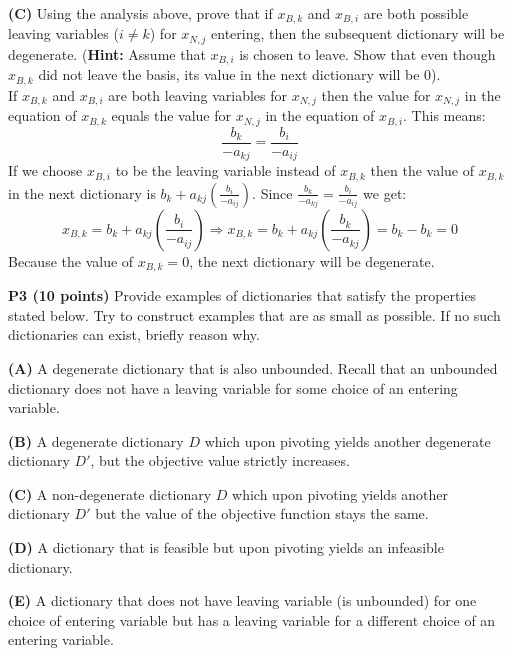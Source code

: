 \documentclass[11pt]{article}
\begin{document}
\medskip


\noindent\textbf{(C)} Using the analysis above, prove that if $x_{B,k}$
and $x_{B,i}$ are both possible leaving variables ($i \not= k$) for $x_{N,j}$ entering,
then  the subsequent dictionary will be degenerate.  (\textbf{Hint:}
Assume that $x_{B,i}$ is chosen to leave. Show that even though $x_{B,k}$ did not leave the basis, its value in
the  next dictionary will be $0$).
\\
If $x_{B,k}$ and $x_{B,i}$ are both leaving variables for $x_{N,j}$ then the value for $x_{N,j}$ in the equation of $x_{B,k}$ equals the value for $x_{N,j}$ in the equation of $x_{B,i}$.  This means:
$$
\frac{b_k}{-a_{kj}} = \frac{b_i}{-a_{ij}}
$$
If we choose $x_{B,i}$ to be the leaving variable instead of $x_{B,k}$ then the value of $x_{B,k}$ in the next dictionary is $b_k + a_{kj}(\frac{b_i}{ - a_{ij}})$.  Since $\frac{b_k}{-a_{kj}} = \frac{b_i}{-a_{ij}}$ we get:
$$
x_{B,k} = b_k + a_{kj}(\frac{b_i}{ - a_{ij}}) \Rightarrow x_{B,k} = b_k + a_{kj}(\frac{b_k}{-a_{kj}}) = b_k - b_k = 0 
$$
Because the value of $x_{B,k} = 0$, the next dictionary will be degenerate.

\bigskip

\noindent\textbf{P3 (10 points)}  Provide examples of dictionaries
that satisfy the properties stated below. Try to construct
examples that are as small as possible. If no such
dictionaries can exist, briefly reason why.


\noindent\textbf{(A)} A degenerate dictionary that is also unbounded. 
Recall that an unbounded dictionary does not have a leaving variable for some
choice of an entering variable.

\medskip

\noindent\textbf{(B)} A degenerate dictionary $D$ which upon pivoting
yields another degenerate dictionary $D'$, but the objective value strictly
increases.

\medskip

\noindent\textbf{(C)} A non-degenerate dictionary $D$ which upon pivoting
yields another dictionary $D'$ but the value of the objective function
stays the same.

\medskip

\noindent\textbf{(D)} A dictionary that is feasible but upon pivoting
yields an infeasible dictionary.


\medskip

\noindent\textbf{(E)} A dictionary that does not have leaving variable
(is unbounded) for one choice of entering variable but has a leaving
variable for a different choice of an entering variable.
\end{document}
